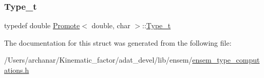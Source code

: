 \subsubsection{\texorpdfstring{Type\_t}{Type\_t}\hspace{0.1cm}{\footnotesize\ttfamily [2/2]}}
{\footnotesize\ttfamily typedef double \mbox{\hyperlink{structPromote}{Promote}}$<$ double, char $>$\+::\mbox{\hyperlink{structPromote_3_01double_00_01char_01_4_a9eda575d7d1de94d1933944cf245dc9f}{Type\+\_\+t}}}



The documentation for this struct was generated from the following file\+:\begin{DoxyCompactItemize}
\item 
/\+Users/archanar/\+Kinematic\+\_\+factor/adat\+\_\+devel/lib/ensem/\mbox{\hyperlink{lib_2ensem_2ensem__type__computations_8h}{ensem\+\_\+type\+\_\+computations.\+h}}\end{DoxyCompactItemize}
